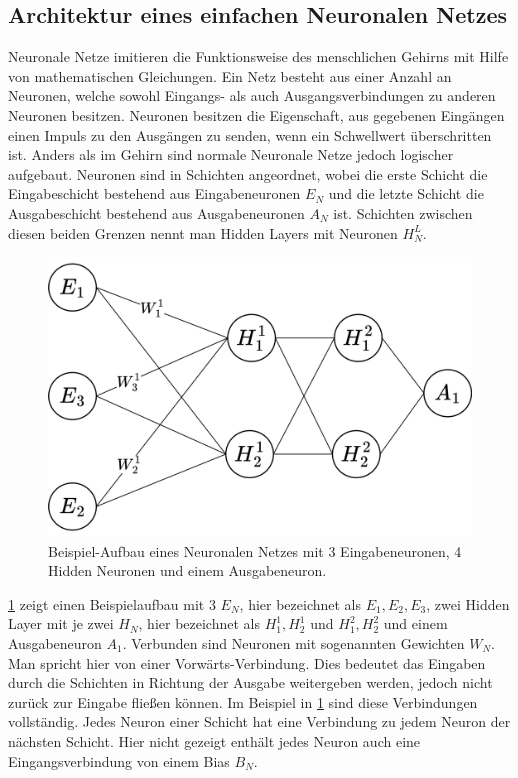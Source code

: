 \subsection{Architektur eines einfachen Neuronalen Netzes}
Neuronale Netze imitieren die Funktionsweise des menschlichen Gehirns mit Hilfe von mathematischen Gleichungen.
Ein Netz besteht aus einer Anzahl an Neuronen, welche sowohl Eingangs- als auch Ausgangsverbindungen zu anderen Neuronen besitzen.
Neuronen besitzen die Eigenschaft, aus gegebenen Eingängen einen Impuls zu den Ausgängen zu senden, wenn ein Schwellwert überschritten ist.
Anders als im Gehirn sind normale Neuronale Netze jedoch logischer aufgebaut.
Neuronen sind in Schichten angeordnet, wobei die erste Schicht die Eingabeschicht bestehend aus Eingabeneuronen $E_N$ und die letzte Schicht die Ausgabeschicht bestehend aus Ausgabeneuronen $A_N$ ist.
Schichten zwischen diesen beiden Grenzen nennt man Hidden Layers mit Neuronen $H^L_N$.\\


\begin{figure}
    \centering
    \includegraphics[width=\textwidth]{zeichnungen/nn.png}
    \caption{Beispiel-Aufbau eines Neuronalen Netzes mit 3 Eingabeneuronen, 4 Hidden Neuronen und einem Ausgabeneuron.}\label{nn_simple}
\end{figure}

\cref{nn_simple} zeigt einen Beispielaufbau mit 3 $E_N$, hier bezeichnet als $E_1,E_2,E_3$, zwei Hidden Layer mit je zwei $H_N$, hier bezeichnet als $H^1_1, H^1_2$ und $H^2_1, H^2_2$ und einem Ausgabeneuron $A_1$.
Verbunden sind Neuronen mit sogenannten Gewichten $W_N$. Man spricht hier von einer Vorwärts-Verbindung.
Dies bedeutet das Eingaben durch die Schichten in Richtung der Ausgabe weitergeben werden, jedoch nicht zurück zur Eingabe fließen können.
Im Beispiel in \cref{nn_simple} sind diese Verbindungen vollständig.
Jedes Neuron einer Schicht hat eine Verbindung zu jedem Neuron der nächsten Schicht.
Hier nicht gezeigt enthält jedes Neuron auch eine Eingangsverbindung von einem Bias $B_N$.

